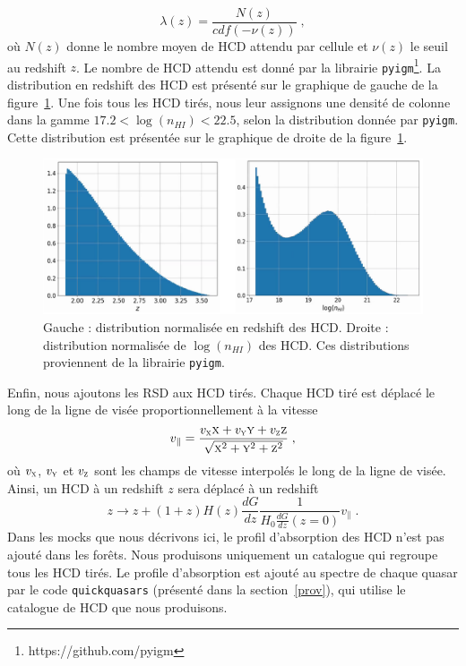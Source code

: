 \documentclass[11pt, twoside, a4paper, openright]{report}
\begin{document}
\begin{equation}
  \lambda(z) = \frac{N(z)}{cdf(-\nu(z))} \; ,
\end{equation}
où $N(z)$ donne le nombre moyen de HCD attendu par cellule et $\nu(z)$ le seuil au redshift $z$. Le nombre de HCD attendu est donné par la librairie \texttt{pyigm}\footnote{https://github.com/pyigm}. La distribution en redshift des HCD est présenté sur le graphique de gauche de la figure~\ref{fig:distrib_dla}. Une fois tous les HCD tirés, nous leur assignons une densité de colonne dans la gamme $\num{17.2} < \log(n_{HI}) < \num{22.5}$, selon la distribution donnée par \texttt{pyigm}. Cette distribution est présentée sur le graphique de droite de la figure~\ref{fig:distrib_dla}.
\begin{figure}
  \centering
  \includegraphics[scale=0.38]{distrib_dla}
  \caption{Gauche : distribution normalisée en redshift des HCD. Droite : distribution normalisée de $\log(n_{HI})$ des HCD. Ces distributions proviennent de la librairie \texttt{pyigm}.}
  \label{fig:distrib_dla}
\end{figure}
Enfin, nous ajoutons les RSD aux HCD tirés. Chaque HCD tiré est déplacé le long de la ligne de visée proportionnellement à la vitesse
\begin{equation}
v_{\parallel} = \frac{v_{\textsc{x}} \textsc{x} + v_{\textsc{y}} \textsc{y} + v_{\textsc{z}} \textsc{z}}{\sqrt{\textsc{x}^2 + \textsc{y}^2 + \textsc{z}^2}} \; ,
\end{equation}
où $v_{\textsc{x}}$, $v_{\textsc{y}}$ et $v_{\textsc{z}}$ sont les champs de vitesse interpolés le long de la ligne de visée. Ainsi, un HCD à un redshift $z$ sera déplacé à un redshift
\begin{equation}
   z \rightarrow  z + (1+z) H(z) \frac{dG}{dz} \frac{1}{H_0 \frac{dG}{dz}(z=0)} v_{\parallel} \; .
\end{equation}
Dans les mocks que nous décrivons ici, le profil d'absorption des HCD n'est pas ajouté dans les forêts. Nous produisons uniquement un catalogue qui regroupe tous les HCD tirés. Le profile d'absorption est ajouté au spectre de chaque quasar par le code \texttt{quickquasars} (présenté dans la section~\ref{prov}), qui utilise le catalogue de HCD que nous produisons.
\end{document}
